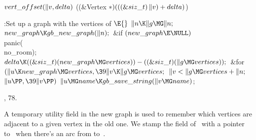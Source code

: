 \Y\B\4\D$\\{vert\_offset}(\|v,\\{delta})$ \5
((\&{Vertex} ${}{*})(((\&{siz\_t})\,\|v)+\\{delta}){}$)\par
\Y\B\4:Set up a graph with the vertices of \X${}\E{}$\6
$\|n\K\|g\MG\|n;{}$\6
${}\\{new\_graph}\K\\{gb\_new\_graph}(\|n);{}$\6
\&{if} ${}(\\{new\_graph}\E\NULL){}$\1\5
\\{panic}(\\{no\_room});\2\6
${}\\{delta}\K((\&{siz\_t})(\\{new\_graph}\MG\\{vertices}))-((\&{siz\_t})(\|g%
\MG\\{vertices}));{}$\6
\&{for} ${}(\|u\K\\{new\_graph}\MG\\{vertices},\39\|v\K\|g\MG\\{vertices};{}$
${}\|v<\|g\MG\\{vertices}+\|n;{}$ ${}\|u\PP,\39\|v\PP){}$\1\5
${}\|u\MG\\{name}\K\\{gb\_save\_string}(\|v\MG\\{name}){}$;\2\par
{}, 78.\fi

A temporary utility field in the new graph is used to remember which
vertices are adjacent to a given vertex in the old one. We stamp the 
field of~ with a pointer to~ when there's an arc from 
to~.

